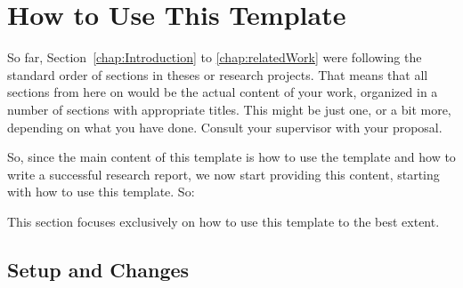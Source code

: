 \chapter{How to Use This Template}

So far, Section~\ref{chap:Introduction} to \ref{chap:relatedWork} were following the standard order of sections in theses or research projects. That means that all sections from here on would be the actual content of your work, organized in a number of sections with appropriate titles. This might be just one, or a bit more, depending on what you have done. Consult your supervisor with your proposal.

So, since the main content of this template is how to use the template and how to write a successful research report, we now start providing this content, starting with how to use this template. So:

This section focuses exclusively on how to use this template to the best extent.

\section{Setup and Changes}

